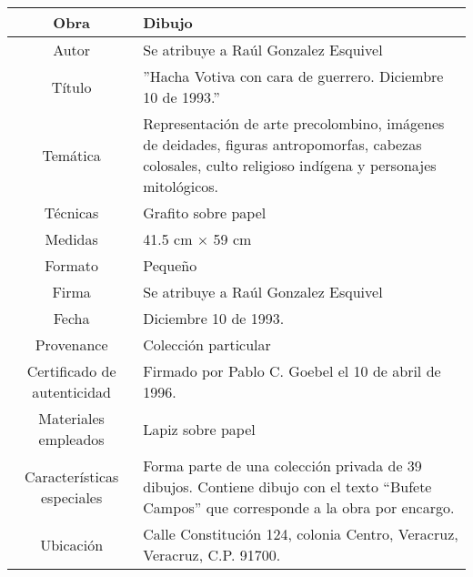 \documentclass[10pt,letter]{report}
\begin{document}
\begin{table}[H]
\centering
\begin{tabular}{|c|m{}|}
\hline
Obra& Dibujo	\\
\hline
Autor & Se atribuye a Ra\'ul Gonzalez Esquivel\\
\hline
T\'itulo & ''Hacha Votiva con cara de guerrero. Diciembre 10 de 1993.'' \\
\hline
Tem\'atica & Representaci\'on de arte precolombino, im\'agenes de deidades, figuras antropomorfas, cabezas colosales, culto religioso ind\'igena y personajes mitol\'ogicos.\\
\hline
T\'ecnicas &Grafito sobre papel \\
\hline
Medidas & 41.5 cm $\times$ 59 cm \\
\hline
 Formato & Peque\~no \\
 \hline
 Firma & Se atribuye a Ra\'ul Gonzalez Esquivel\\ 
 \hline
  Fecha & Diciembre 10 de 1993. \\
 \hline
 Provenance & Colecci\'on particular\\
 \hline
 Certificado de autenticidad& Firmado por Pablo C. Goebel el 10 de abril de 1996.  \\
 \hline 
  Materiales empleados & Lapiz sobre papel\\
 \hline
 Caracter\'isticas especiales & Forma parte de una colecci\'on privada de 39 dibujos. 
Contiene dibujo con el texto ``Bufete Campos'' que corresponde a la obra por encargo. \\
\hline 
Ubicaci\'on & Calle Constituci\'on 124, colonia Centro, Veracruz, Veracruz, C.P. 91700.\\
\hline

\end{tabular}
\end{table}
\end{document}
